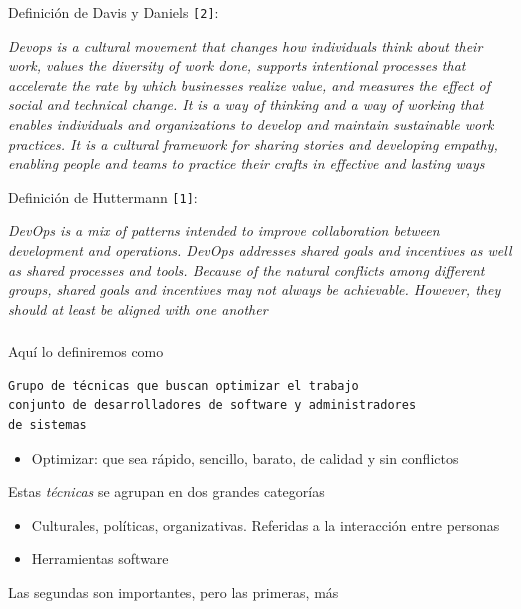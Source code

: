 \documentclass[ucs]{beamer}
\begin{document}
\begin{frame}[fragile]
\frametitle{}
Definición de Davis y Daniels \verb|[2]|:

\emph{Devops is a cultural movement that changes how individuals think about their work,
values the diversity of work done, supports intentional processes that accelerate the
rate by which businesses realize value, and measures the effect of social and technical
change. It is a way of thinking and a way of working that enables individuals and
organizations to develop and maintain sustainable work practices. It is a cultural
framework for sharing stories and developing empathy, enabling people and teams to
practice their crafts in effective and lasting ways} 


\end{frame}
\begin{frame}[fragile]

Definición de Huttermann \verb|[1]|:


\emph{DevOps is a mix of patterns intended to improve collaboration between development and
operations. DevOps addresses shared goals and incentives as well as shared processes
and tools. Because of the natural conflicts among different groups, shared goals and
incentives may not always be achievable. However, they should at least be aligned with
one another}

\end{frame}


\begin{frame}[fragile]
\frametitle{}
Aquí lo definiremos como

  \begin{verbatim}
Grupo de técnicas que buscan optimizar el trabajo 
conjunto de desarrolladores de software y administradores 
de sistemas
  \end{verbatim}


\begin{itemize}
\item
Optimizar: que sea rápido, sencillo, barato, de calidad y sin conflictos
\end{itemize}


Estas \emph{técnicas} se agrupan en dos grandes categorías

\begin{itemize}
\item
Culturales, políticas, organizativas. Referidas a la interacción entre personas

\item
Herramientas software
\end{itemize}

Las segundas son importantes, pero las primeras, más

\end{frame}
\end{document}
